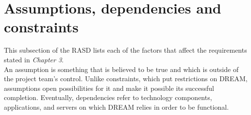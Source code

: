 \section{Assumptions, dependencies and constraints}

This subsection of the RASD lists each of the factors that affect the requirements stated in \textit{Chapter 3}.\\

An assumption is something that is believed to be true and which is outside of the project team’s control. Unlike constraints, which put restrictions on DREAM, assumptions open possibilities for it and make it possible its successful completion.
Eventually, dependencies refer to technology components, applications, and servers on which DREAM relies in order to be functional.



